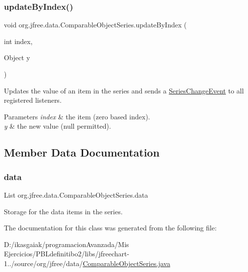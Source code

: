 \subsubsection{\texorpdfstring{update\+By\+Index()}{updateByIndex()}}
{\footnotesize\ttfamily void org.\+jfree.\+data.\+Comparable\+Object\+Series.\+update\+By\+Index (\begin{DoxyParamCaption}\item[{int}]{index,  }\item[{Object}]{y }\end{DoxyParamCaption})\hspace{0.3cm}{\ttfamily [protected]}}

Updates the value of an item in the series and sends a \mbox{\hyperlink{}{Series\+Change\+Event}} to all registered listeners.


\begin{DoxyParams}{Parameters}
{\em index} & the item (zero based index). \\
\hline
{\em y} & the new value ({\ttfamily null} permitted). \\
\hline
\end{DoxyParams}


\subsection{Member Data Documentation}
\mbox{\label{classorg_1_1jfree_1_1data_1_1_comparable_object_series_abacebadb1f34908e900081407daaaa9b}} 
\subsubsection{\texorpdfstring{data}{data}}
{\footnotesize\ttfamily List org.\+jfree.\+data.\+Comparable\+Object\+Series.\+data\hspace{0.3cm}{\ttfamily [protected]}}

Storage for the data items in the series. 

The documentation for this class was generated from the following file\+:\begin{DoxyCompactItemize}
\item 
D\+:/ikasgaiak/programacion\+Avanzada/\+Mis Ejercicios/\+P\+B\+Ldefinitibo2/libs/jfreechart-\/1../source/org/jfree/data/\mbox{\hyperlink{_comparable_object_series_8java}{Comparable\+Object\+Series.\+java}}\end{DoxyCompactItemize}
